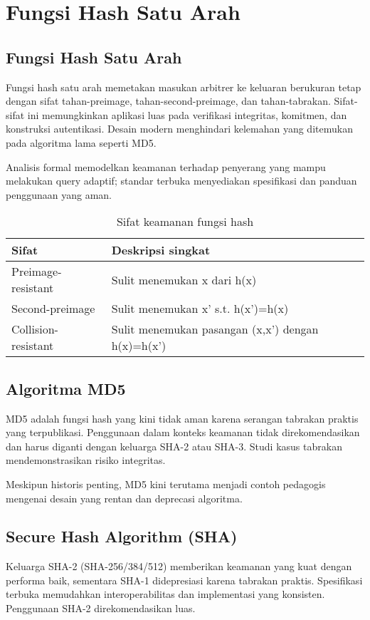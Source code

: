 \documentclass[../main.tex]{subfiles}
\begin{document}
\chapter{Fungsi Hash Satu Arah}

\section{Fungsi Hash Satu Arah}
Fungsi hash satu arah memetakan masukan arbitrer ke keluaran berukuran tetap dengan sifat tahan-preimage, tahan-second-preimage, dan tahan-tabrakan. Sifat-sifat ini memungkinkan aplikasi luas pada verifikasi integritas, komitmen, dan konstruksi autentikasi. Desain modern menghindari kelemahan yang ditemukan pada algoritma lama seperti MD5.

Analisis formal memodelkan keamanan terhadap penyerang yang mampu melakukan query adaptif; standar terbuka menyediakan spesifikasi dan panduan penggunaan yang aman.

\begin{table}[h]
\centering
\caption{Sifat keamanan fungsi hash}
\label{tab:hash-props}
\begin{tabular}{ll}
\toprule
Sifat & Deskripsi singkat \\
\midrule
Preimage-resistant & Sulit menemukan x dari h(x) \\
Second-preimage & Sulit menemukan x' s.t. h(x')=h(x) \\
Collision-resistant & Sulit menemukan pasangan (x,x') dengan h(x)=h(x') \\
\bottomrule
\end{tabular}
\end{table}

\section{Algoritma MD5}
MD5 adalah fungsi hash yang kini tidak aman karena serangan tabrakan praktis yang terpublikasi. Penggunaan dalam konteks keamanan tidak direkomendasikan dan harus diganti dengan keluarga SHA-2 atau SHA-3. Studi kasus tabrakan mendemonstrasikan risiko integritas.

Meskipun historis penting, MD5 kini terutama menjadi contoh pedagogis mengenai desain yang rentan dan deprecasi algoritma.

\section{Secure Hash Algorithm (SHA)}
Keluarga SHA-2 (SHA-256/384/512) memberikan keamanan yang kuat dengan performa baik, sementara SHA-1 didepresiasi karena tabrakan praktis. Spesifikasi terbuka memudahkan interoperabilitas dan implementasi yang konsisten. Penggunaan SHA-2 direkomendasikan luas.
\end{document}
